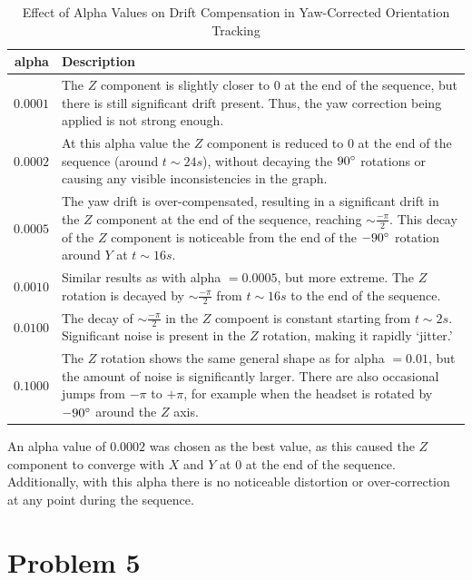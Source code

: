 \documentclass[11pt,a4paper]{article}
\begin{document}
	\begin{table}[h!]
		\caption{Effect of Alpha Values on Drift Compensation in Yaw-Corrected Orientation Tracking}
		\label{table_alpha_yaw}
		\begin{tabu} to 1.0\linewidth {|r|X[l]|}
			\hline
			alpha&Description\\
			\hline
			$0.0001$&The $Z$ component is slightly closer to $0$ at the end of the sequence, but there is still significant drift present. Thus, the yaw correction being applied is not strong enough.\\
			\hline
			$0.0002$&At this alpha value the $Z$ component is reduced to 0 at the end of the sequence (around $t\sim24s$), without decaying the $90\degree$ rotations or causing any visible inconsistencies in the graph.\\
			\hline
			$0.0005$&The yaw drift is over-compensated, resulting in a significant drift in the $Z$ component at the end of the sequence, reaching $\sim\frac{-\pi}{2}$. This decay of the $Z$ component is noticeable from the end of the $-90\degree$ rotation around $Y$ at $t\sim16s$.\\
			\hline
			$0.0010$&Similar results as with alpha $=0.0005$, but more extreme. The $Z$ rotation is decayed by $\sim\frac{-\pi}{2}$ from $t\sim16s$ to the end of the sequence.\\
			\hline
			$0.0100$&The decay of $\sim\frac{-\pi}{2}$ in the $Z$ compoent is constant starting from $t\sim2s$. Significant noise is present in the $Z$ rotation, making it rapidly `jitter.'\\
			\hline
			$0.1000$&The $Z$ rotation shows the same general shape as for alpha $=0.01$, but the amount of noise is significantly larger. There are also occasional jumps from $-\pi$ to $+\pi$, for example when the headset is rotated by $-90\degree$ around the $Z$ axis.\\
			\hline
		\end{tabu}
	\end{table}
	
	\noindent An alpha value of $0.0002$ was chosen as the best value, as this caused the $Z$ component to converge with $X$ and $Y$ at $0$ at the end of the sequence. Additionally, with this alpha there is no noticeable distortion or over-correction at any point during the sequence.
	
	\section*{Problem 5}
	
\end{document}
